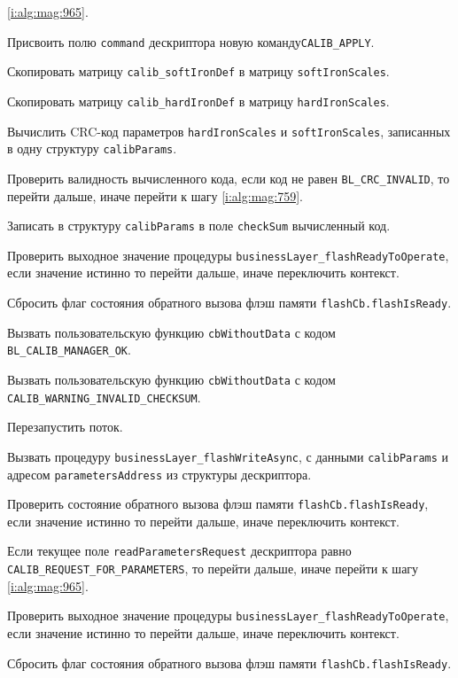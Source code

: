 \begin{enumerate_step}
    \ref{i:alg:mag:965}.
    \item Присвоить полю \lstinline|command| дескриптора  новую команду\lstinline|CALIB_APPLY|.
    \item Скопировать матрицу \lstinline|calib_softIronDef| в матрицу \lstinline|softIronScales|.
    \item Скопировать матрицу \lstinline|calib_hardIronDef| в матрицу \lstinline|hardIronScales|.
    \item Вычислить CRC-код параметров \lstinline|hardIronScales| и \lstinline|softIronScales|, записанных в одну структуру \lstinline|calibParams|.
    \item Проверить валидность вычисленного кода, если код не равен \lstinline|BL_CRC_INVALID|, то перейти дальше, иначе перейти к шагу \ref{i:alg:mag:759}.
    \item Записать в структуру \lstinline|calibParams| в поле \lstinline|checkSum| вычисленный код.
    \item Проверить выходное значение процедуры \lstinline|businessLayer_flashReadyToOperate|, если значение истинно то перейти дальше, иначе переключить контекст.
    \item Сбросить флаг состояния обратного вызова флэш памяти \lstinline|flashCb.flashIsReady|.
    \item Вызвать пользовательскую функцию \lstinline|cbWithoutData| с кодом \lstinline|BL_CALIB_MANAGER_OK|.
    \item \label{i:alg:mag:759} Вызвать пользовательскую функцию \lstinline|cbWithoutData| с кодом \lstinline|CALIB_WARNING_INVALID_CHECKSUM|.
    \item Перезапустить поток.
    \item Вызвать процедуру \lstinline|businessLayer_flashWriteAsync|, с данными \lstinline|calibParams| и адресом \lstinline|parametersAddress| из структуры дескриптора.
    \item Проверить состояние обратного вызова флэш памяти \lstinline|flashCb.flashIsReady|, если значение истинно то перейти дальше, иначе переключить контекст.
    \item \label{i:alg:mag:967} Если текущее поле \lstinline|readParametersRequest| дескриптора равно \lstinline|CALIB_REQUEST_FOR_PARAMETERS|, то перейти дальше, иначе перейти к шагу
    \ref{i:alg:mag:965}. 
    \item Проверить выходное значение процедуры \lstinline|businessLayer_flashReadyToOperate|, если значение истинно то перейти дальше, иначе переключить контекст.
    \item Сбросить флаг состояния обратного вызова флэш памяти \lstinline|flashCb.flashIsReady|.

\end{enumerate_step}
